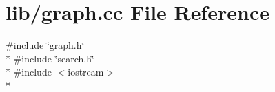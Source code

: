 \section{lib/graph.cc File Reference}
\label{lib_2graph_8cc}
{\ttfamily \#include \char`\"{}graph.\-h\char`\"{}}\\*
{\ttfamily \#include \char`\"{}search.\-h\char`\"{}}\\*
{\ttfamily \#include $<$iostream$>$}\\*
